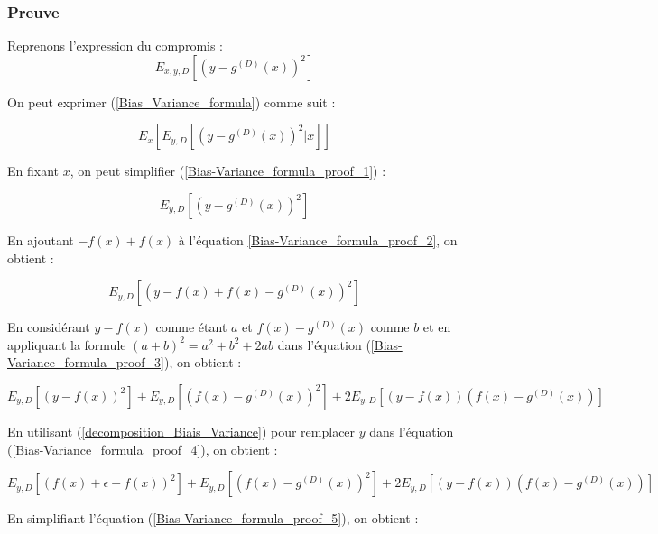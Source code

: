 \documentclass[a4paper]{article}
\begin{document}
\subsubsection{Preuve}

Reprenons l'expression du compromis :
\begin{equation}
\label{Bias_Variance_formula}
E_{x,y,D}[(y-g^{(D)}(x))^2]
\end{equation}

On peut exprimer (\ref{Bias_Variance_formula}) comme suit : 

\begin{equation}
\label{Bias-Variance_formula_proof_1}
E_x [E_{y,D} [(y - g^{(D)}(x))^2 | x]]
\end{equation}

En fixant $x$, on peut simplifier (\ref{Bias-Variance_formula_proof_1}) :

\begin{equation}
\label{Bias-Variance_formula_proof_2}
E_{y,D}[ (y - g^{(D)}(x))^2]
\end{equation}

En ajoutant $ - f(x) + f(x) $ à l'équation \ref{Bias-Variance_formula_proof_2}, on obtient :

\begin{equation}
\label{Bias-Variance_formula_proof_3}
E_{y,D}[ (y - f(x) + f(x) - g^{(D)}(x))^2]
\end{equation}

En considérant $ y - f(x) $ comme étant $a$ et $ f(x) - g^{(D)}(x)$ comme $b$ et en appliquant la formule $(a+b)^2 = a^2 + b^2 + 2ab$ dans l'équation (\ref{Bias-Variance_formula_proof_3}), on obtient :

\begin{equation}
\label{Bias-Variance_formula_proof_4}
E_{y,D} [(y-f(x))^2] + E_{y,D} [(f(x) - g^{(D)}(x))^2] + 2E_{y,D} [(y-f(x)) (f(x) - g^{(D)}(x)) ]
\end{equation}

En utilisant (\ref{decomposition_Biais_Variance}) pour remplacer $y$ dans l'équation (\ref{Bias-Variance_formula_proof_4}), on obtient :

\begin{equation}
\label{Bias-Variance_formula_proof_5}
E_{y,D} [(f(x) + \epsilon - f(x))^2] + E_{y,D} [(f(x) - g^{(D)}(x))^2] + 2E_{y,D} [(y-f(x)) (f(x) - g^{(D)}(x)) ]
\end{equation}

En simplifiant l'équation (\ref{Bias-Variance_formula_proof_5}), on obtient :
\end{document}
